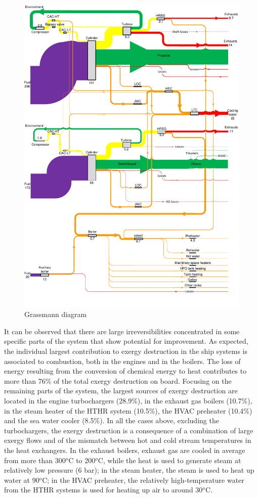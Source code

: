 \documentclass[preprint,12pt]{elsarticle}
\begin{document}
\begin{figure}
	\centering
	\includegraphics[width=0.95\linewidth]{Figures/Grassmann_diagram_v5}
	\caption{Grassmann diagram}
	\label{fig:Grassmann}
\end{figure}

It can be observed that there are large irreversibilities concentrated in some specific parts of the system that show potential for improvement. As expected, the individual largest contribution to exergy destruction in the ship systems is associated to combustion, both in the engines and in the boilers. The loss of energy resulting from the conversion of chemical energy to heat contributes to more than 76\% of the total exergy destruction on board. Focusing on the remaining parts of the system, the largest sources of exergy destruction are located in the engine turbochargers (28.9\%), in the exhaust gas boilers (10.7\%), in the steam heater of the HTHR system (10.5\%), the HVAC preheater (10.4\%) and the sea water cooler (8.5\%). In all the cases above, excluding the turbochargers, the exergy destruction is a consequence of a combination of large exergy flows and of the mismatch between hot and cold stream temperatures in the heat exchangers. In the exhaust boilers, exhaust gas are cooled in average from more than 300$^o$C to 200$^o$C, while the heat is used to generate steam at relatively low pressure (6 bar); in the steam heater, the steam is used to heat up water at 90$^o$C; in the HVAC preheater, the relatively high-temperature water from the HTHR systems is used for heating up air to around 30$^o$C.
\end{document}
